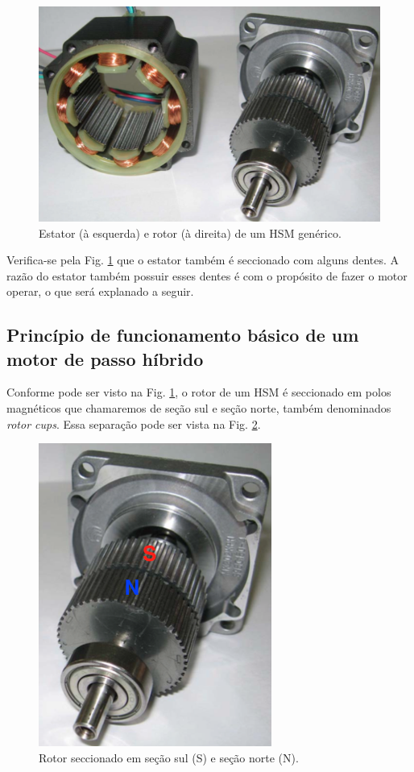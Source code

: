 	\begin{figure}[H]
		\centering
		\includegraphics[scale=.4]{Images/hsmreal2.png}
		\caption{Estator (à esquerda) e rotor (à direita) de um HSM genérico. \cite{ieeeRusso}}
		\label{HSMestatorrotor}
	\end{figure} 
	
	Verifica-se pela Fig. \ref{HSMestatorrotor} que o estator também é seccionado com alguns dentes. A razão do estator também possuir esses dentes é com o propósito de fazer o motor operar, o que será explanado a seguir.
	
	\subsection{Princípio de funcionamento básico de um motor de passo híbrido}
	
	Conforme pode ser visto na Fig. \ref{HSMestatorrotor}, o rotor de um HSM é seccionado em polos magnéticos que chamaremos de seção sul e seção norte, também denominados \textit{rotor cups}. Essa separação pode ser vista na Fig. \ref{rotorsec}.
	
	\begin{figure}[H]
		\centering 
		\includegraphics[scale=0.45]{images/hsm_operation/hsmrotorreal}
		\caption{Rotor seccionado em seção sul (S) e seção norte (N). \cite{ieeeRusso}}
		\label{rotorsec}
	\end{figure}
	
